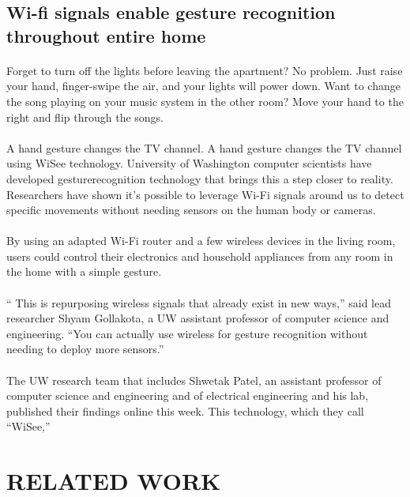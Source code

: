 \documentclass[a4paper,12pt,oneside]{article}
\begin{document}
\subsection{Wi-fi signals enable gesture recognition throughout entire home}
\paragraph{}
Forget to turn off the lights before leaving the apartment? No problem. Just raise your
hand, finger-swipe the air, and your lights will power down. Want to change the song playing on
your music system in the other room? Move your hand to the right and flip through the songs.
\paragraph{}
A hand gesture changes the TV channel. A hand gesture changes the TV channel using
WiSee technology. University of Washington computer scientists have developed gesturerecognition
technology that brings this a step closer to reality. Researchers have shown it’s
possible to leverage Wi-Fi signals around us to detect specific movements without needing
sensors on the human body or cameras.
\paragraph{}
By using an adapted Wi-Fi router and a few wireless devices in the living room, users
could control their electronics and household appliances from any room in the home with a
simple gesture.
\paragraph{}
“ This is repurposing wireless signals that already exist in new ways,” said lead researcher
Shyam Gollakota, a UW assistant professor of computer science and engineering. “You can
actually use wireless for gesture recognition without needing to deploy more sensors.”
\paragraph{}
The UW research team that includes Shwetak Patel, an assistant professor of computer
science and engineering and of electrical engineering and his lab, published their findings online
this week. This technology, which they call “WiSee,”


\newpage
\section{RELATED WORK}
\end{document}
